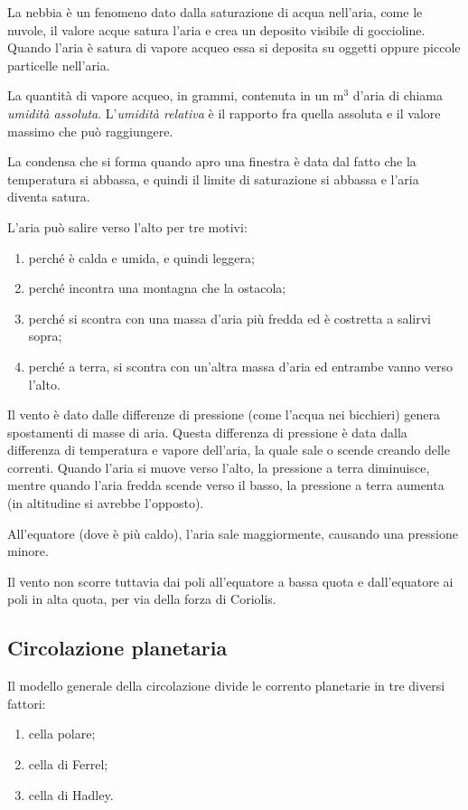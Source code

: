 \documentclass[a4paper]{article}
\begin{document}
La nebbia è un fenomeno dato dalla saturazione di acqua nell'aria,
come le nuvole, il valore acque satura l'aria e crea un deposito visibile di goccioline.
Quando l'aria è satura di vapore acqueo essa si deposita su oggetti oppure piccole particelle nell'aria.

La quantità di vapore acqueo, in grammi, contenuta in un m\({}^3\) d'aria di chiama \textit{umidità assoluta}.
L'\textit{umidità relativa} è il rapporto fra quella assoluta e il valore massimo che può raggiungere.

La condensa che si forma quando apro una finestra è data dal fatto che la temperatura si abbassa, e quindi
il limite di saturazione si abbassa e l'aria diventa satura.

L'aria può salire verso l'alto per tre motivi:
\begin{enumerate}
    \item perché è calda e umida, e quindi leggera;
    \item perché incontra una montagna che la ostacola;
    \item perché si scontra con una massa d'aria più fredda ed è costretta a salirvi sopra;
    \item perché a terra, si scontra con un'altra massa d'aria ed entrambe vanno verso l'alto.
\end{enumerate}

Il vento è dato dalle differenze di pressione (come l'acqua nei bicchieri)
genera spostamenti di masse di aria.
Questa differenza di pressione è data dalla differenza di temperatura e vapore dell'aria,
la quale sale o scende creando delle correnti.
Quando l'aria si muove verso l'alto, la pressione a terra diminuisce,
mentre quando l'aria fredda scende verso il basso, la pressione a terra aumenta
(in altitudine si avrebbe l'opposto).

All'equatore (dove è più caldo), l'aria sale maggiormente, causando una pressione minore.

Il vento non scorre tuttavia dai poli all'equatore a bassa quota e dall'equatore ai poli in alta quota,
per via della forza di Coriolis.

\subsection{Circolazione planetaria}

Il modello generale della circolazione divide le corrento planetarie in tre diversi fattori:
\begin{enumerate}
    \item cella polare;
    \item cella di Ferrel;
    \item cella di Hadley.
\end{enumerate}
\end{document}
